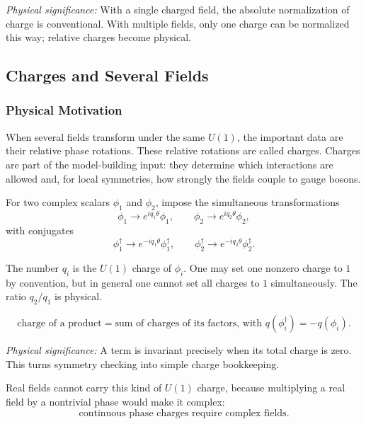 \documentclass[../main.tex]{subfiles}
\begin{document}
\textit{Physical significance:} With a single charged field, the absolute normalization of charge is conventional.  With multiple fields, only one charge can be normalized this way; relative charges become physical.

\subsection*{Charges and Several Fields}

\subsubsection*{Physical Motivation}

When several fields transform under the same $U(1)$, the important data are their relative phase rotations.  These relative rotations are called charges.  Charges are part of the model-building input: they determine which interactions are allowed and, for local symmetries, how strongly the fields couple to gauge bosons.

For two complex scalars $\phi_1$ and $\phi_2$, impose the simultaneous transformations
\begin{equation}
  \boxed{
  \phi_1\to e^{iq_1\theta}\phi_1,
  \qquad
  \phi_2\to e^{iq_2\theta}\phi_2,}
  \label{eq:lec09:two-field-u1}
\end{equation}
with conjugates
\begin{equation}
  \boxed{
  \phi_1^\dagger\to e^{-iq_1\theta}\phi_1^\dagger,
  \qquad
  \phi_2^\dagger\to e^{-iq_2\theta}\phi_2^\dagger.}
  \label{eq:lec09:two-field-u1-conjugates}
\end{equation}

The number $q_i$ is the $U(1)$ charge of $\phi_i$.  One may set one nonzero charge to $1$ by convention, but in general one cannot set all charges to $1$ simultaneously.  The ratio $q_2/q_1$ is physical.

\begin{equation}
  \boxed{
  \text{charge of a product}
  =
  \text{sum of charges of its factors, with }
  q(\phi_i^\dagger)=-q(\phi_i).}
  \label{eq:lec09:charge-addition}
\end{equation}

\textit{Physical significance:} A term is invariant precisely when its total charge is zero.  This turns symmetry checking into simple charge bookkeeping.

Real fields cannot carry this kind of $U(1)$ charge, because multiplying a real field by a nontrivial phase would make it complex:
\begin{equation}
  \boxed{
  \text{continuous phase charges require complex fields.}}
  \label{eq:lec09:real-fields-neutral}
\end{equation}
\end{document}

